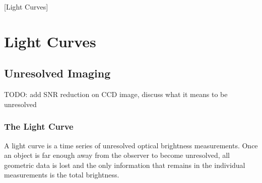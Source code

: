 [Light Curves]

\chapter{Light Curves}

\section{Unresolved Imaging}

TODO: add SNR reduction on CCD image, discuss what it means to be unresolved

\subsection{The Light Curve}

A light curve is a time series of unresolved optical brightness measurements. Once an object is far
enough away from the observer to become unresolved, all geometric data is lost and the only
information that remains in the individual measurements is the total brightness. 
